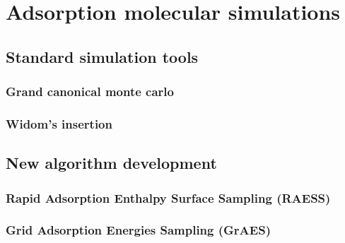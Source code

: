 \documentclass[thesis]{subfiles}
\begin{document}
\chapter{Adsorption molecular simulations}
\vspace*{-1\baselineskip}
\section{Standard simulation tools}

\subsection{Grand canonical monte carlo}

\subsection{Widom's insertion}

\section{New algorithm development}

\subsection{Rapid Adsorption Enthalpy Surface Sampling (RAESS)}

\subsection{Grid Adsorption Energies Sampling (GrAES)}

\OnlyInSubfile{\printglobalbibliography}
\end{document}
